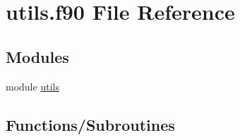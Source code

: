 \hypertarget{utils_8f90}{}\section{utils.\+f90 File Reference}
\label{utils_8f90}
\subsection*{Modules}
\begin{DoxyCompactItemize}
\item 
module \hyperlink{namespaceutils}{utils}
\end{DoxyCompactItemize}
\subsection*{Functions/\+Subroutines}
